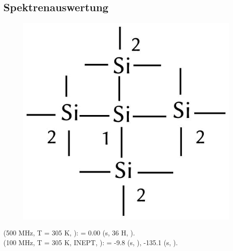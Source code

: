 \documentclass[12pt]{article}
\begin{document}
\begin{onehalfspace}
\section{Spektrenauswertung}
\begin{figure}[!ht]
   \centering
\includegraphics[scale=0.3]{auswert.png}
\end{figure}
\noindent
\textbf{} (500 MHz, T = 305 \si{\kelvin}, ): \sffamily \ce{$\delta$} =
0.00 (s, 36 H, ). \\
\noindent
\textbf{} (100 MHz, T = 305 \si{\kelvin}, INEPT, ): \sffamily \ce{$\delta$} =
-9.8 (s, ),
-135.1 (s, ).



\end{onehalfspace}
\end{document}
